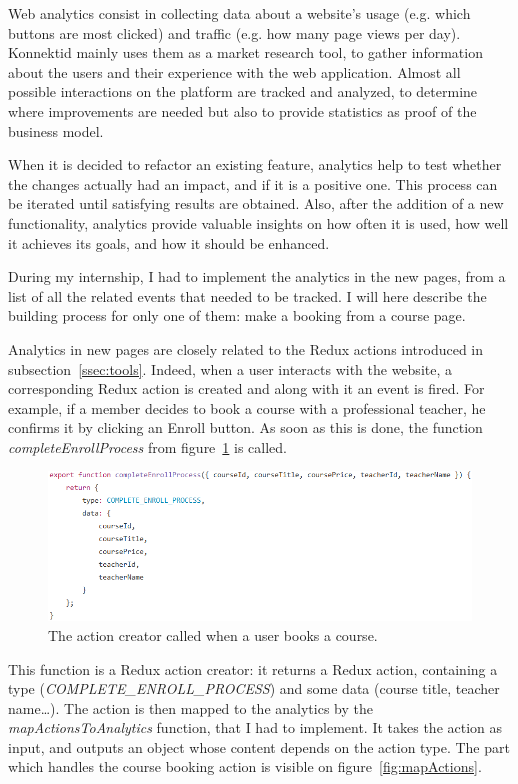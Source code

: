 Web analytics consist in collecting data about a website's usage (e.g. which buttons are most clicked) and traffic (e.g. how many page views per day). Konnektid mainly uses them as a market research tool, to gather information about the users and their experience with the web application. Almost all possible interactions on the platform are tracked and analyzed, to determine where improvements are needed but also to provide statistics as proof of the business model.

When it is decided to refactor an existing feature, analytics help to test whether the changes actually had an impact, and if it is a positive one. This process can be iterated until satisfying results are obtained. Also, after the addition of a new functionality, analytics provide valuable insights on how often it is used, how well it achieves its goals, and how it should be enhanced. 

During my internship, I had to implement the analytics in the new pages, from a list of all the related events that needed to be tracked. I will here describe the building process for only one of them: make a booking from a course page.

Analytics in new pages are closely related to the Redux actions introduced in {\sc subsection}~\ref{ssec:tools}. Indeed, when a user interacts with the website, a corresponding Redux action is created and along with it an event is fired. For example, if a member decides to book a course with a professional teacher, he confirms it by clicking an \guillemotleft{} Enroll \guillemotright{} button. As soon as this is done, the function \textit{completeEnrollProcess} from {\sc figure}~\ref{fig:enroll} is called.

\begin{figure}[H]
    \centering
    \includegraphics{figure/enroll.png}
    \caption{The action creator called when a user books a course.}
    \label{fig:enroll}
\end{figure}

This function is a Redux action creator: it returns a Redux action, containing a type (\textit{COMPLETE\_ENROLL\_PROCESS}) and some data (course title, teacher name\ldots). The action is then mapped to the analytics by the \textit{mapActionsToAnalytics} function, that I had to implement. It takes the action as input, and outputs an object whose content depends on the action type. The part which handles the course booking action is visible on {\sc figure}~\ref{fig:mapActions}.

